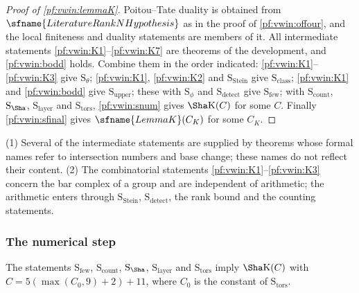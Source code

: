 \begin{proof}[Proof of \cref{pf:vwin:lemmaK}]
Poitou--Tate duality is obtained from $\sfname{LiteratureRankNHypothesis}$ as in the proof of \cref{pf:vwin:offour}, and the local finiteness and
duality statements are members of it. All intermediate statements \ref{pf:vwin:K1}--\ref{pf:vwin:K7} are theorems of the development, and
\cref{pf:vwin:bodd} holds. Combine them in the order indicated: \ref{pf:vwin:K1}--\ref{pf:vwin:K3} give $\mathrm{S}_\theta$; \ref{pf:vwin:K1},
\ref{pf:vwin:K2} and $\mathrm{S}_{\mathrm{Stein}}$ give $\mathrm{S}_{\mathrm{class}}$; \ref{pf:vwin:K1} and \cref{pf:vwin:bodd} give
$\mathrm{S}_{\mathrm{upper}}$; these with $\mathrm{S}_\phi$ and $\mathrm{S}_{\mathrm{detect}}$ give $\mathrm{S}_{\mathrm{few}}$; with
$\mathrm{S}_{\mathrm{count}}$, $\mathrm{S}_\Sha$, $\mathrm{S}_{\mathrm{layer}}$ and $\mathrm{S}_{\mathrm{tors}}$, \cref{pf:vwin:snum} gives
$\Sha\mathrm{K}(C)$ for some $C$. Finally \cref{pf:vwin:sfinal} gives $\sfname{LemmaK}(C_K)$ for some $C_K$.
\end{proof}

\begin{remark}\label{pf:vwin:rem-K}
(1) Several of the intermediate statements are supplied by theorems whose formal names refer to intersection numbers and base change; these
names do not reflect their content. (2) The combinatorial statements \ref{pf:vwin:K1}--\ref{pf:vwin:K3} concern the bar complex of a group and
are independent of arithmetic; the arithmetic enters through $\mathrm{S}_{\mathrm{Stein}}$, $\mathrm{S}_{\mathrm{detect}}$, the rank bound and the
counting statements.
\end{remark}

\subsubsection{The numerical step}

\begin{proposition}\label{pf:vwin:snum}
The statements $\mathrm{S}_{\mathrm{few}}$, $\mathrm{S}_{\mathrm{count}}$, $\mathrm{S}_\Sha$, $\mathrm{S}_{\mathrm{layer}}$ and
$\mathrm{S}_{\mathrm{tors}}$ imply $\Sha\mathrm{K}(C)$ with $C=5(\max(C_0,9)+2)+11$, where $C_0$ is the constant of $\mathrm{S}_{\mathrm{tors}}$.
\end{proposition}

